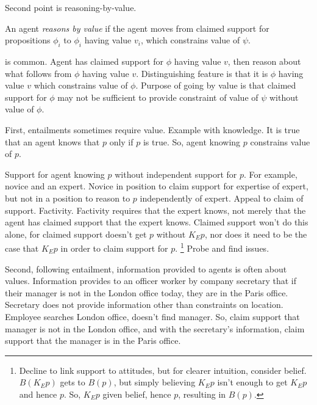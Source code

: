 \begin{note}[\RBV{}]
  Second point is reasoning-by-value.

  \begin{proposition}
    An agent \emph{reasons by value} if the agent moves from claimed support for propositions \(\phi_{i}\) to \(\phi_{i}\) having value \(v_{i}\), which constrains value of \(\psi\).
  \end{proposition}

  \RBV{} is common.
  Agent has claimed support for \(\phi\) having value \(v\), then reason about what follows from \(\phi\) having value \(v\).
  Distinguishing feature is that it is \(\phi\) having value \(v\) which constrains value of \(\phi\).
  Purpose of going by value is that claimed support for \(\phi\) may not be sufficient to provide constraint of value of \(\psi\) without value of \(\phi\).

  First, entailments sometimes require value.
  Example with knowledge.
  It is true that an agent knows that \(p\) only if \(p\) is true.
  So, agent knowing \(p\) constrains value of \(p\).

  Support for agent knowing \(p\) without independent support for \(p\).
  For example, novice and an expert.
  Novice in position to claim support for expertise of expert, but not in a position to reason to \(p\) independently of expert.
  Appeal to claim of support.
  Factivity.
  Factivity requires that the expert knows, not merely that the agent has claimed support that the expert knows.
  Claimed support won't do this alone, for claimed support doesn't get \(p\) without \(K_{E}p\), nor does it need to be the case that \(K_{E}p\) in order to claim support for \(p\).\nolinebreak
  \footnote{
    Decline to link support to attitudes, but for clearer intuition, consider belief.
    \(B(K_{E}p)\) gets to \(B(p)\), but simply believing \(K_{E}p\) isn't enough to get \(K_{E}p\) and hence \(p\).
    So, \(K_{E}p\) given belief, hence \(p\), resulting in \(B(p)\).
  }
  Probe and find issues.

  Second, following entailment, information provided to agents is often about values.
  Information provides to an officer worker by company secretary that if their manager is not in the London office today, they are in the Paris office.
  Secretary does not provide information other than constraints on location.
  Employee searches London office, doesn't find manager.
  So, claim support that manager is not in the London office, and with the secretary's information, claim support that the manager is in the Paris office.


\end{note}
